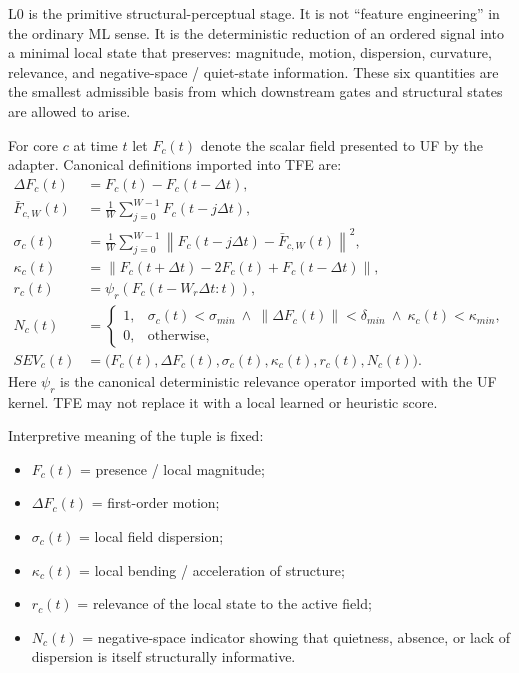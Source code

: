 \documentclass[11pt]{report}
\begin{document}
L0 is the primitive structural-perceptual stage. It is not ``feature engineering'' in the ordinary ML sense. It is the deterministic reduction of an ordered signal into a minimal local state that preserves: magnitude, motion, dispersion, curvature, relevance, and negative-space / quiet-state information. These six quantities are the smallest admissible basis from which downstream gates and structural states are allowed to arise.

For core $c$ at time $t$ let $F_c(t)$ denote the scalar field presented to UF by the adapter. Canonical definitions imported into TFE are:
\begin{align*}
\Delta F_c(t) &= F_c(t)-F_c(t-\Delta t),\\
\bar F_{c,W}(t) &= \frac{1}{W}\sum_{j=0}^{W-1}F_c(t-j\Delta t),\\
\sigma_c(t) &= \frac{1}{W}\sum_{j=0}^{W-1}\left\lVert F_c(t-j\Delta t)-\bar F_{c,W}(t)\right\rVert^2,\\
\kappa_c(t) &= \left\lVert F_c(t+\Delta t)-2F_c(t)+F_c(t-\Delta t)\right\rVert,\\
r_c(t) &= \psi_r\!\left(F_c(t-W_r\Delta t:t)\right),\\
N_c(t) &= \begin{cases}
1, & \sigma_c(t)<\sigma_{min}\ \wedge\ \lVert\Delta F_c(t)\rVert<\delta_{min}\ \wedge\ \kappa_c(t)<\kappa_{min},\\
0, & \text{otherwise,}
\end{cases}\\
SEV_c(t) &= \big(F_c(t),\Delta F_c(t),\sigma_c(t),\kappa_c(t),r_c(t),N_c(t)\big).
\end{align*}
Here $\psi_r$ is the canonical deterministic relevance operator imported with the UF kernel. TFE may not replace it with a local learned or heuristic score.

Interpretive meaning of the tuple is fixed:
\begin{itemize}
    \item $F_c(t)$ = presence / local magnitude;
    \item $\Delta F_c(t)$ = first-order motion;
    \item $\sigma_c(t)$ = local field dispersion;
    \item $\kappa_c(t)$ = local bending / acceleration of structure;
    \item $r_c(t)$ = relevance of the local state to the active field;
    \item $N_c(t)$ = negative-space indicator showing that quietness, absence, or lack of dispersion is itself structurally informative.
\end{itemize}
\end{document}
